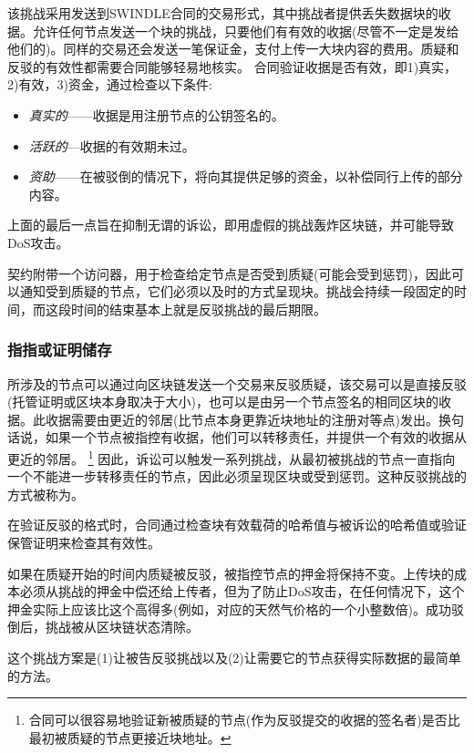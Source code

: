 该挑战采用发送到SWINDLE合同的交易形式，其中挑战者提供丢失数据块的收据。允许任何节点发送一个块的挑战，只要他们有有效的收据(尽管不一定是发给他们的)。同样的交易还会发送一笔保证金，支付上传一大块内容的费用。质疑和反驳的有效性都需要合同能够轻易地核实。
合同验证收据是否有效，即1)真实，2)有效，3)资金，通过检查以下条件:

\begin{itemize}
\item \emph{真实的}——收据是用注册节点的公钥签名的。
\item \emph{活跃的}—收据的有效期未过。
\item \emph{资助}——在被驳倒的情况下，将向其提供足够的资金，以补偿同行上传的部分内容。
\end{itemize}

上面的最后一点旨在抑制无谓的诉讼，即用虚假的挑战轰炸区块链，并可能导致DoS攻击。

契约附带一个访问器，用于检查给定节点是否受到质疑(可能会受到惩罚)，因此可以通知受到质疑的节点，它们必须以及时的方式呈现块。挑战会持续一段固定的时间，而这段时间的结束基本上就是反驳挑战的最后期限。 


\subsubsection{指指或证明储存}


所涉及的节点可以通过向区块链发送一个交易来反驳质疑，该交易可以是直接反驳(托管证明或区块本身取决于大小)，也可以是由另一个节点签名的相同区块的收据。此收据需要由更近的邻居(比节点本身更靠近块地址的注册对等点)发出。换句话说，如果一个节点被指控有收据，他们可以转移责任，并提供一个有效的收据从更近的邻居。%
%
\footnote{合同可以很容易地验证新被质疑的节点(作为反驳提交的收据的签名者)是否比最初被质疑的节点更接近块地址。}
%
因此，诉讼可以触发一系列挑战，从最初被挑战的节点一直指向一个不能进一步转移责任的节点，因此必须呈现区块或受到惩罚。这种反驳挑战的方式被称为。 

在验证反驳的格式时，合同通过检查块有效载荷的哈希值与被诉讼的哈希值或验证保管证明来检查其有效性。 

如果在质疑开始的时间内质疑被反驳，被指控节点的押金将保持不变。上传块的成本必须从挑战的押金中偿还给上传者，但为了防止DoS攻击，在任何情况下，这个押金实际上应该比这个高得多(例如，对应的天然气价格的一个小整数倍)。成功驳倒后，挑战被从区块链状态清除。

这个挑战方案是(1)让被告反驳挑战以及(2)让需要它的节点获得实际数据的最简单的方法。

